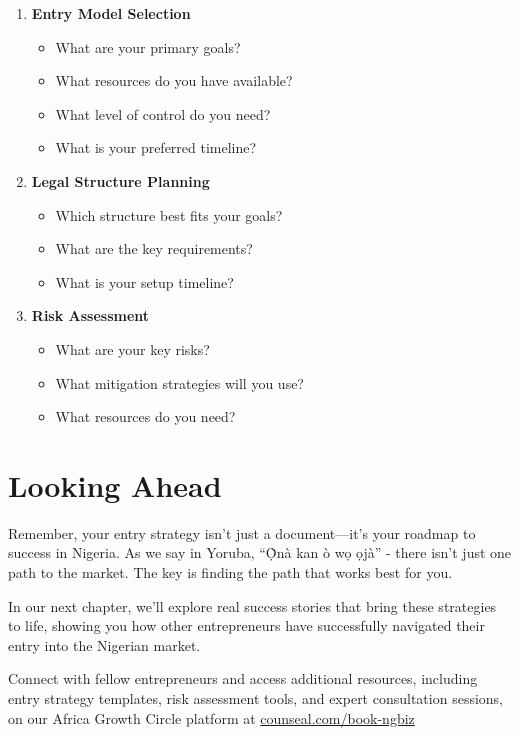 \begin{enumerate}
    \item \textbf{Entry Model Selection}
    \begin{itemize}
        \item What are your primary goals?
        \item What resources do you have available?
        \item What level of control do you need?
        \item What is your preferred timeline?
    \end{itemize}
    \item \textbf{Legal Structure Planning}
    \begin{itemize}
        \item Which structure best fits your goals?
        \item What are the key requirements?
        \item What is your setup timeline?
    \end{itemize}
    \item \textbf{Risk Assessment}
    \begin{itemize}
        \item What are your key risks?
        \item What mitigation strategies will you use?
        \item What resources do you need?
    \end{itemize}
\end{enumerate}

\section{Looking Ahead}\label{sec:looking-ahead}

Remember, your entry strategy isn't just a document—it's your roadmap to success in Nigeria.
As we say in Yoruba, ``Ọ̀nà kan ò wọ ọjà'' - there isn't just one path to the market. The key is finding the path that works best for you.

In our next chapter, we'll explore real success stories that bring these strategies to life, showing you how other entrepreneurs have successfully navigated their entry into the Nigerian market.

Connect with fellow entrepreneurs and access additional resources, including entry strategy templates, risk assessment tools, and expert consultation sessions, on our Africa Growth Circle platform at \href{https://viz.li/csl-book-ngbiz}{counseal.com/book-ngbiz}

